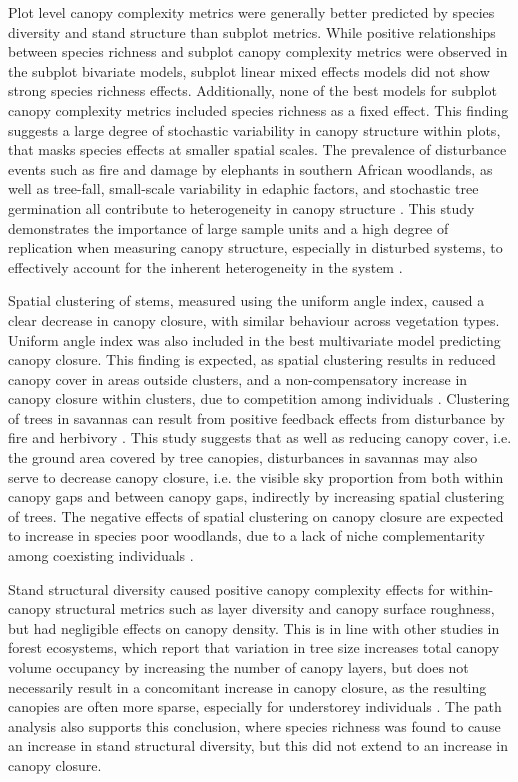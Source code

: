 \documentclass[11pt,a4paper]{article}
\begin{document}
Plot level canopy complexity metrics were generally better predicted by species diversity and stand structure than subplot metrics. While positive relationships between species richness and subplot canopy complexity metrics were observed in the subplot bivariate models, subplot linear mixed effects models did not show strong species richness effects. Additionally, none of the best models for subplot canopy complexity metrics included species richness as a fixed effect. This finding suggests a large degree of stochastic variability in canopy structure within plots, that masks species effects at smaller spatial scales. The prevalence of disturbance events such as fire and damage by elephants in southern African woodlands, as well as tree-fall, small-scale variability in edaphic factors, and stochastic tree germination all contribute to heterogeneity in canopy structure \citep{}. This study demonstrates the importance of large sample units and a high degree of replication when measuring canopy structure, especially in disturbed systems, to effectively account for the inherent heterogeneity in the system \citep{}.
 
Spatial clustering of stems, measured using the uniform angle index, caused a clear decrease in canopy closure, with similar behaviour across vegetation types. Uniform angle index was also included in the best multivariate model predicting canopy closure. This finding is expected, as spatial clustering results in reduced canopy cover in areas outside clusters, and a non-compensatory increase in canopy closure within clusters, due to competition among individuals \citep{}. Clustering of trees in savannas can result from positive feedback effects from disturbance by fire and herbivory \citep{}. This study suggests that as well as reducing canopy cover, i.e. the ground area covered by tree canopies, disturbances in savannas may also serve to decrease canopy closure, i.e. the visible sky proportion from both within canopy gaps and between canopy gaps, indirectly by increasing spatial clustering of trees. The negative effects of spatial clustering on canopy closure are expected to increase in species poor woodlands, due to a lack of niche complementarity among coexisting individuals \citep{}. 

Stand structural diversity caused positive canopy complexity effects for within-canopy structural metrics such as layer diversity and canopy surface roughness, but had negligible effects on canopy density. This is in line with other studies in forest ecosystems, which report that variation in tree size increases total canopy volume occupancy by increasing the number of canopy layers, but does not necessarily result in a concomitant increase in canopy closure, as the resulting canopies are often more sparse, especially for understorey individuals \citep{}. The path analysis also supports this conclusion, where species richness was found to cause an increase in stand structural diversity, but this did not extend to an increase in canopy closure. 
\end{document}
